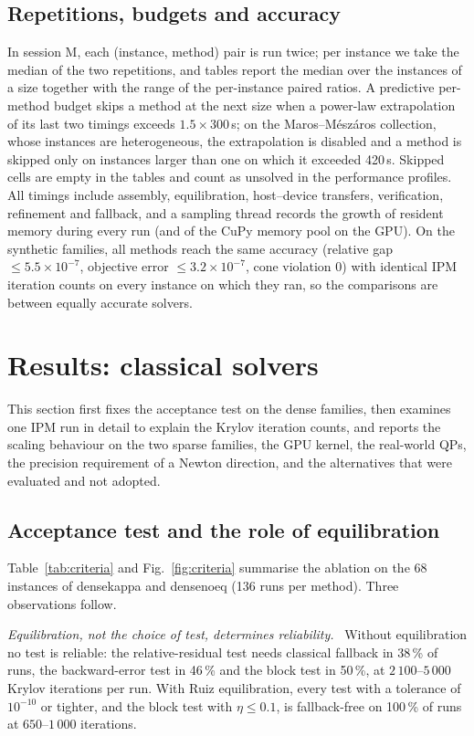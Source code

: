 \documentclass[11pt]{article}
\theoremstyle{definition}
\newcommand{\dsus}{\textunderscore\penalty5000\hskip0pt\relax}
\newcommand{\ds}[1]{{\ttfamily\let\_\dsus#1}}
\newcommand{\lead}[1]{\emph{#1}\ }
\begin{document}
\subsection{Repetitions, budgets and accuracy}
In session M, each (instance, method) pair is run twice; per instance we take the median of the two repetitions, and tables report the median over the instances of a size together with the range of the per-instance paired ratios. A predictive per-method budget skips a method at the next size when a power-law extrapolation of its last two timings exceeds $1.5\times300$\,s; on the Maros--M\'esz\'aros collection, whose instances are heterogeneous, the extrapolation is disabled and a method is skipped only on instances larger than one on which it exceeded 420\,s. Skipped cells are empty in the tables and count as unsolved in the performance profiles. All timings include assembly, equilibration, host--device transfers, verification, refinement and fallback, and a sampling thread records the growth of resident memory during every run (and of the CuPy memory pool on the GPU). On the synthetic families, all methods reach the same accuracy (relative gap $\le5.5\times10^{-7}$, objective error $\le3.2\times10^{-7}$, cone violation 0) with identical IPM iteration counts on every instance on which they ran, so the comparisons are between equally accurate solvers.

\section{Results: classical solvers}\label{sec:classical}
This section first fixes the acceptance test on the dense families, then examines one IPM run in detail to explain the Krylov iteration counts, and reports the scaling behaviour on the two sparse families, the GPU kernel, the real-world QPs, the precision requirement of a Newton direction, and the alternatives that were evaluated and not adopted.

\subsection{Acceptance test and the role of equilibration}\label{sec:criteria}
Table~\ref{tab:criteria} and Fig.~\ref{fig:criteria} summarise the ablation on the 68 instances of \ds{dense\_kappa} and \ds{dense\_noeq} (136 runs per method). Three observations follow.

\lead{Equilibration, not the choice of test, determines reliability.} Without equilibration no test is reliable: the relative-residual test needs classical fallback in 38\,\% of runs, the backward-error test in 46\,\% and the block test in 50\,\%, at $2\,100$--$5\,000$ Krylov iterations per run. With Ruiz equilibration, every test with a tolerance of $10^{-10}$ or tighter, and the block test with $\eta\le0.1$, is fallback-free on 100\,\% of runs at $650$--$1\,000$ iterations.
\end{document}
